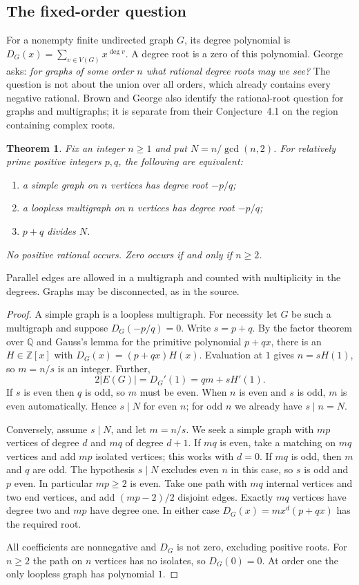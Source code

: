\documentclass[11pt,a4paper]{article}
\numberwithin{equation}{section}
\newtheorem{theorem}{Theorem}[section]
\theoremstyle{definition}
\theoremstyle{remark}
\begin{document}
\subsection*{The fixed-order question}
For a nonempty finite undirected graph $G$, its degree polynomial is
$D_G(x)=\sum_{v\in V(G)}x^{\deg v}$. A degree root is a zero of this
polynomial. George \cite[Sec.~4.1, pp.~96--97]{r31reiwa:george} asks:
\textit{for graphs of some order $n$ what rational degree roots may we see?}
The question is not about the union over all orders, which already
contains every negative rational. Brown and George \cite[Sec.~4, p.~181]{r31reiwa:bg}
also identify the rational-root question for graphs and multigraphs; it is
separate from their Conjecture~4.1 on the region containing complex roots.

\begin{theorem}
Fix an integer $n\ge1$ and put $N=n/\gcd(n,2)$. For relatively prime
positive integers $p,q$, the following are equivalent:
\begin{enumerate}
\item a simple graph on $n$ vertices has degree root $-p/q$;
\item a loopless multigraph on $n$ vertices has degree root $-p/q$;
\item $p+q$ divides $N$.
\end{enumerate}
No positive rational occurs. Zero occurs if and only if $n\ge2$.
\end{theorem}
Parallel edges are allowed in a multigraph and counted with
multiplicity in the degrees. Graphs may be disconnected, as in the source.

\begin{proof}
A simple graph is a loopless multigraph. For necessity let $G$ be such a
multigraph and suppose $D_G(-p/q)=0$. Write $s=p+q$. By the factor theorem
over $\mathbb Q$ and Gauss's lemma for the primitive polynomial $p+qx$,
there is an $H\in\mathbb Z[x]$ with $D_G(x)=(p+qx)H(x)$.
Evaluation at $1$ gives $n=sH(1)$, so $m=n/s$ is an integer. Further,
\[
 2|E(G)|=D_G'(1)=qm+sH'(1).
\]
If $s$ is even then $q$ is odd, so $m$ must be even. When $n$ is even
and $s$ is odd, $m$ is even automatically. Hence $s\mid N$ for even
$n$; for odd $n$ we already have $s\mid n=N$.

Conversely, assume $s\mid N$, and let $m=n/s$. We seek a simple graph
with $mp$ vertices of degree $d$ and $mq$ of degree $d+1$. If $mq$ is
even, take a matching on $mq$ vertices and add $mp$ isolated vertices;
this works with $d=0$. If $mq$ is odd, then $m$ and $q$ are odd.
The hypothesis $s\mid N$ excludes even $n$ in this case, so $s$ is odd
and $p$ even. In particular $mp\ge2$ is even. Take one path with $mq$
internal vertices and two end vertices, and add $(mp-2)/2$ disjoint
edges. Exactly $mq$ vertices have degree two and $mp$ have degree one.
In either case $D_G(x)=m x^d(p+qx)$ has the required root.

All coefficients are nonnegative and $D_G$ is not zero, excluding positive
roots. For $n\ge2$ the path on $n$ vertices has no isolates, so $D_G(0)=0$.
At order one the only loopless graph has polynomial $1$.
\end{proof}
\end{document}
